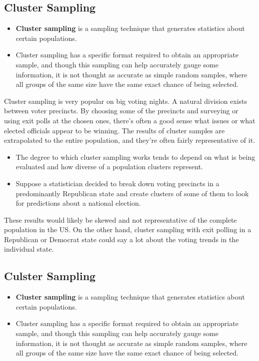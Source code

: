 ﻿\documentclass[]{report}
\begin{document}
\normalsize
\subsection{Cluster Sampling}

\begin{itemize}
\item \textbf{Cluster sampling} is a sampling technique that generates statistics about certain populations. 
\item Cluster sampling has a specific format required to obtain an appropriate sample, and though this sampling can help accurately gauge some information, it is not thought as accurate as simple random samples, where all groups of the same size have the same exact chance of being selected.
\end{itemize}
\normalsize




Cluster sampling is very popular on big voting nights. A natural division exists between voter precincts. By choosing some of the precincts and surveying or using exit polls at the chosen ones, there’s often a good sense what issues or what elected officials appear to be winning. The results of cluster samples are extrapolated to the entire population, and they’re often fairly representative of it. 




\begin{itemize}
\item The degree to which cluster sampling works tends to depend on what is being evaluated and how diverse of a population clusters represent.
\item  Suppose a statistician decided to break down voting precincts in a predominantly Republican state and create clusters of some of them to look for predictions about a national election.
\end{itemize}


These results would likely be skewed and not representative of the complete population in the US. On the other hand, cluster sampling with exit polling in a Republican or Democrat state could say a lot about the voting trends in the individual state. 

\subsection{Culster Sampling}

\begin{itemize}
\item \textbf{Cluster sampling} is a sampling technique that generates statistics about certain populations. 
\item Cluster sampling has a specific format required to obtain an appropriate sample, and though this sampling can help accurately gauge some information, it is not thought as accurate as simple random samples, where all groups of the same size have the same exact chance of being selected.
\end{itemize}
\end{document}
